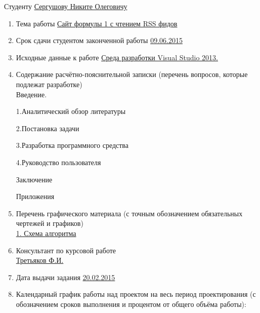 \documentclass[14pt,a4paper]{extreport}
\begin{document}
	\endcenter
	\raggedright
	Студенту \underline{ Сергушову Никите Олеговичу }\\
	\begin{enumerate}
	\item Тема работы \underline{Сайт формулы 1 с чтением RSS фидов}\\ 
	\item Срок сдачи студентом законченной работы \underline{09.06.2015}
	\item Исходные данные к работе \underline{Среда разработки Visual Studio 2013. }
	\item Содержание расчётно-пояснительной записки (перечень вопросов, которые подлежат разработке)\\
	\underline{\hspace*{16cm}}\hspace*{-16cm}Введение.\par
	\underline{\hspace*{16cm}}\hspace*{-16cm}1.Аналитический обзор литературы\par
	\underline{\hspace*{16cm}}\hspace*{-16cm}2.Постановка задачи\par
	\underline{\hspace*{16cm}}\hspace*{-16cm}3.Разработка программного средства\par
	\underline{\hspace*{16cm}}\hspace*{-16cm}4.Руководство пользователя\par
	\underline{\hspace*{16cm}}\hspace*{-16cm}Заключение\par
	\underline{\hspace*{16cm}}\hspace*{-16cm}Приложения\par
	\item Перечень графического материала (с точным обозначением обязательных чертежей и графиков)\\
	\underline{1. Схема алгоритма}
	\item Консультант по курсовой работе\\
	\underline{Третьяков Ф.И.}  
	\item Дата выдачи задания \underline{20.02.2015}
	\item Календарный график работы над проектом на весь период проектирования (с обозначением сроков выполнения и процентом от общего объёма работы):\\

\end{enumerate}
\end{document}
